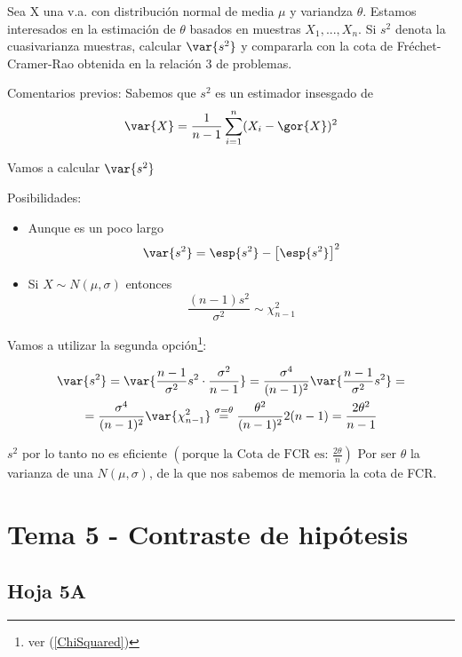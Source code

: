\pagebreak
\begin{problem}[9]
Sea X una v.a. con distribución normal de media $\mu$ y variandza $\theta$. Estamos interesados en la estimación de $\theta$ basados en muestras $X_1,...,X_n$. Si $s^2$ denota la cuasivarianza muestras, calcular $\var{s^2}$ y compararla con la cota de Fréchet-Cramer-Rao obtenida en la relación 3 de problemas.
\solution

Comentarios previos: Sabemos que $s^2$ es un estimador insesgado de \[\var{X} = \frac{1}{n-1} \sum_{i=1}^n (X_i - \gor{X})^2\]

Vamos a calcular $\var{s^2}$

Posibilidades:
\begin{itemize}
\item Aunque es un poco largo\[
\var{s^2} = \esp{s^2}-\left[\esp{s^2}\right]^2
\]

\item Si $X\sim N(\mu,\sigma)$ entonces \[\frac{(n-1)s^2}{\sigma^2} \sim \chi_{n-1}^2 \]
\end{itemize}

Vamos a utilizar la segunda opción\footnote{ver (\ref{ChiSquared})}:

\begin{gather*}
\var{s^2} =
\var{\frac{n-1}{\sigma^2}s^2\cdot\frac{\sigma^2}{n-1}} =
\frac{\sigma^4}{(n-1)^2} \var{\frac{n-1}{\sigma^2}s^2} =\\
= \frac{\sigma^4}{(n-1)^2} \var{\chi^2_{n-1}} \stackrel{\sigma = \theta}{=}
\frac{\theta^2}{(n-1)^2}2(n-1) =
\frac{2\theta^2}{n-1}
\end{gather*}

$s^2$ por lo tanto no es eficiente $\left( \text{porque la Cota de FCR es: } \displaystyle\frac{2\theta}{n}\right)$ Por ser $\theta$ la varianza de una $N(\mu,\sigma)$, de la que nos sabemos de memoria la cota de FCR.

\end{problem}

\newpage
\section{Tema 5 - Contraste de hipótesis}
\subsection{Hoja 5A}

